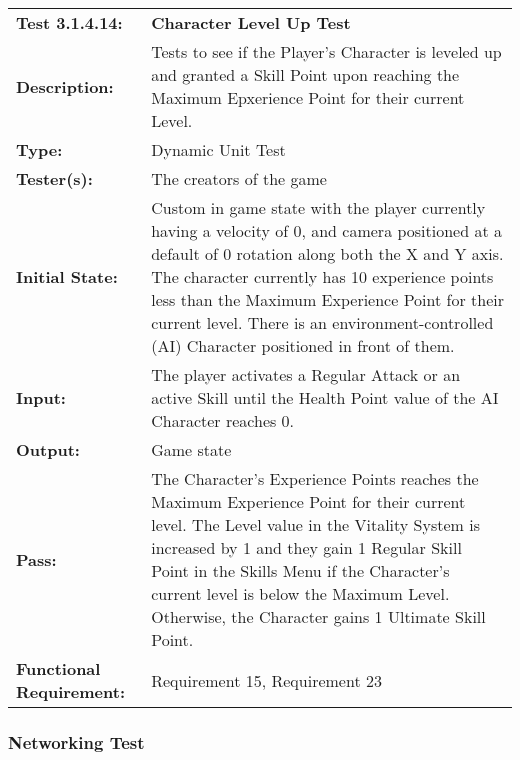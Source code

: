\documentclass[12pt, titlepage]{article}
\begin{document}
\begin{mdframed}[linewidth=1pt]
\begin{tabularx}{\textwidth}{@{}p{3cm}X@{}}
{\bf Test 3.1.4.14:} & {\bf Character Level Up Test}\\[\baselineskip]
{\bf Description:} & Tests to see if the Player's Character is leveled up and granted a Skill Point upon reaching the Maximum Epxerience Point for their current Level. \\[0.5\baselineskip]
{\bf Type:} & Dynamic Unit Test\\[0.5\baselineskip]
{\bf Tester(s):} & The creators of the game\\[0.5\baselineskip]
{\bf Initial State:} & Custom in game state with the player currently having a velocity of 0, and camera positioned at a default of 0 rotation along both the X and Y axis. The character currently has 10 experience points less than the Maximum Experience Point for their current level. There is an environment-controlled (AI) Character positioned in front of them. \\[0.5\baselineskip]
{\bf Input:} & The player activates a Regular Attack or an active Skill until the Health Point value of the AI Character reaches 0. \\[0.5\baselineskip]
{\bf Output:} & Game state\\[0.5\baselineskip]
{\bf Pass:} & The Character's Experience Points reaches the Maximum Experience Point for their current level. The Level value in the Vitality System is increased by 1 and they gain 1 Regular Skill Point in the Skills Menu if the Character's current level is below the Maximum Level. Otherwise, the Character gains 1 Ultimate Skill Point. \\[0.5\baselineskip]
{\bf Functional Requirement:} & Requirement 15, Requirement 23
\end{tabularx}
\end{mdframed}

\newpage
\subsubsection{Networking Test}
\end{document}
